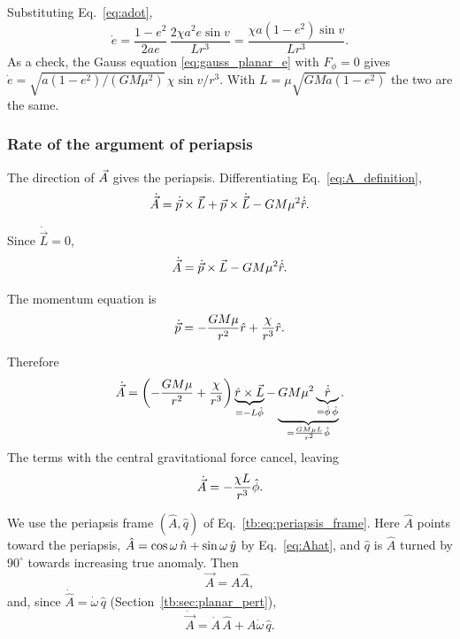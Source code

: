 	Substituting Eq.~\eqref{eq:adot},
	\begin{equation}
		\dot e
		=
		\frac{1-e^2}{2ae}\,
		\frac{2\chi a^2e\sin v}{Lr^3}
		=
		\frac{\chi a(1-e^2)\sin v}{Lr^3}.
	\end{equation}
	As a check, the Gauss equation \eqref{eq:gauss_planar_e} with $F_\phi=0$ gives $\dot e=\sqrt{a(1-e^2)/(GM\mu^2)}\,\chi\sin v/r^3$. With $L=\mu\sqrt{GMa(1-e^2)}$ the two are the same.
	
	
	\subsubsection{Rate of the argument of periapsis}
	
	The direction of $\vec A$ gives the periapsis. Differentiating Eq.~\eqref{eq:A_definition},
	\begin{equation}
		\dot{\vec A}
		=
		\dot{\vec p}\times\vec L
		+
		\vec p\times\dot{\vec L}
		-
		GM\mu^2\dot{\hat r}.
	\end{equation}
	
	Since $\dot{\vec L}=0$,
	\begin{equation}
		\dot{\vec A}
		=
		\dot{\vec p}\times\vec L
		-
		GM\mu^2\dot{\hat r}.
	\end{equation}
	
	The momentum equation is
	\begin{equation}
		\dot{\vec p}
		=
		-\frac{GM\mu}{r^2}\hat r
		+
		\frac{\chi}{r^3}\hat r.
	\end{equation}
	
	Therefore
	\begin{equation}
		\dot{\vec A}
		=
		\left(
		-\frac{GM\mu}{r^2}
		+
		\frac{\chi}{r^3}
		\right)
		\underbrace{\rhat\times\vec L}_{\mathclap{=-L\phihat}}
		-
		\underbrace{GM\mu^2\underbrace{\dot{\rhat}}_{\mathclap{=\dot \phi\,\phihat}}}_{=\frac{GM\mu L}{r^2}\phihat}.
	\end{equation}
	The terms with the central gravitational force cancel, leaving
	\begin{equation}
		\dot{\vec A}
		=
		-\frac{\chi L}{r^3}\hat\phi.
		\label{eq:Adot}
	\end{equation}
	
	We use the periapsis frame $(\hat A,\hat q)$ of Eq.~\eqref{tb:eq:periapsis_frame}. Here $\hat A$ points toward the periapsis, $\hat A=\cos\omega\,\hat n+\sin\omega\,\hat y$ by Eq.~\eqref{eq:Ahat}, and $\hat q$ is $\hat A$ turned by $90^\circ$ towards increasing true anomaly. Then
	\begin{equation}
		\vec A
		=
		A\hat A,
	\end{equation}
	and, since $\dot{\hat A}=\dot\omega\,\hat q$ (Section~\ref{tb:sec:planar_pert}),
	\begin{equation}
		\dot{\vec A}
		=
		\dot A\,\hat A
		+
		A\dot\omega\,\hat q.
		\label{eq:Adot_decomposition}
	\end{equation}
	
